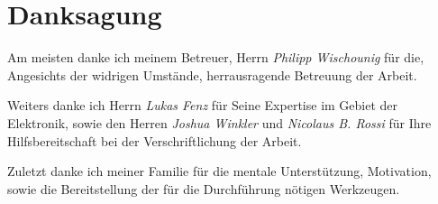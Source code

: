 \section*{Danksagung}

Am meisten danke ich meinem Betreuer, Herrn \textit{Philipp Wischounig} für die, Angesichts der widrigen Umstände, herrausragende Betreuung der Arbeit.

Weiters danke ich Herrn \textit{Lukas Fenz} für Seine Expertise im Gebiet der Elektronik, sowie den Herren \textit{Joshua Winkler} und \textit{Nicolaus B. Rossi} für Ihre Hilfsbereitschaft bei der Verschriftlichung der Arbeit.

Zuletzt danke ich meiner Familie für die mentale Unterstützung, Motivation, sowie die Bereitstellung der für die Durchführung nötigen Werkzeugen.

\newpage